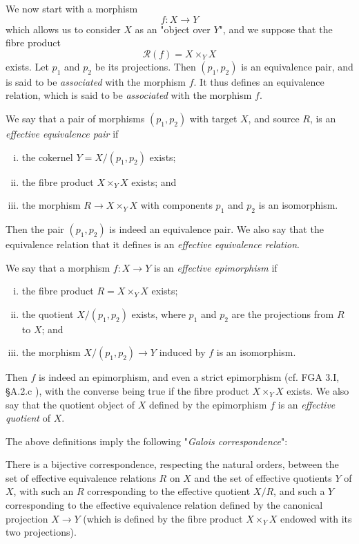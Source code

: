 We now start with a morphism
\[
    f\colon X\to Y
\]
which allows us to consider $X$ as an "object over $Y$", and we suppose that the fibre product
\[
    \mathcal{R}(f)
    = X\times_Y X
\]
exists.
Let $p_1$ and $p_2$ be its projections.
Then $(p_1,p_2)$ is an equivalence pair, and is said to be \emph{associated} with the morphism $f$.
It thus defines an equivalence relation, which is said to be \emph{associated} with the morphism $f$.

We say that a pair of morphisms $(p_1,p_2)$ with target $X$, and source $R$, is an \emph{effective equivalence pair} if

\begin{enumerate}[i.]
    \item the cokernel $Y=X/(p_1,p_2)$ exists;
    \item the fibre product $X\times_Y X$ exists; and
    \item the morphism $R\to X\times_Y X$ with components $p_1$ and $p_2$ is an isomorphism.
\end{enumerate}

Then the pair $(p_1,p_2)$ is indeed an equivalence pair.
We also say that the equivalence relation that it defines is an \emph{effective equivalence relation}.

We say that a morphism $f\colon X\to Y$ is an \emph{effective epimorphism} if

\begin{enumerate}[i.]
    \item the fibre product $R=X\times_Y X$ exists;
    \item the quotient $X/(p_1,p_2)$ exists, where $p_1$ and $p_2$ are the projections from $R$ to $X$; and
    \item the morphism $X/(p_1,p_2)\to Y$ induced by $f$ is an isomorphism.
\end{enumerate}

Then $f$ is indeed an epimorphism, and even a strict epimorphism (cf. FGA 3.I, §A.2.c ), with the converse being true if the fibre product $X\times_Y X$ exists.
We also say that the quotient object of $X$ defined by the epimorphism $f$ is an \emph{effective quotient} of $X$.

The above definitions imply the following "\emph{Galois correspondence}":

\begin{proposition}\label{fga3.iii-1-proposition-1.1}
    There is a bijective correspondence, respecting the natural orders, between the set of effective equivalence relations $R$ on $X$ and the set of effective quotients $Y$ of $X$, with such an $R$ corresponding to the effective quotient $X/R$, and such a $Y$ corresponding to the effective equivalence relation defined by the canonical projection $X\to Y$ (which is defined by the fibre product $X\times_Y X$ endowed with its two projections).
\end{proposition}


